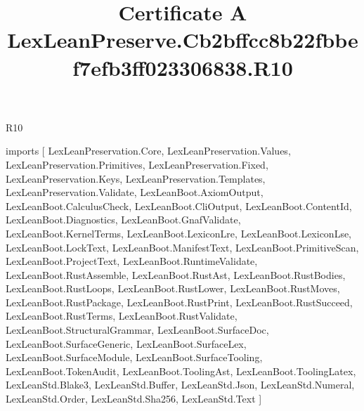 \begin{lexlean}{R10}
\title{Certificate A LexLeanPreserve.Cb2bffcc8b22fbbef7efb3ff023306838.R10}
\begin{coremodule}
imports [
  LexLeanPreservation.Core,
  LexLeanPreservation.Values,
  LexLeanPreservation.Primitives,
  LexLeanPreservation.Fixed,
  LexLeanPreservation.Keys,
  LexLeanPreservation.Templates,
  LexLeanPreservation.Validate,
  LexLeanBoot.AxiomOutput,
  LexLeanBoot.CalculusCheck,
  LexLeanBoot.CliOutput,
  LexLeanBoot.ContentId,
  LexLeanBoot.Diagnostics,
  LexLeanBoot.GnafValidate,
  LexLeanBoot.KernelTerms,
  LexLeanBoot.LexiconLre,
  LexLeanBoot.LexiconLse,
  LexLeanBoot.LockText,
  LexLeanBoot.ManifestText,
  LexLeanBoot.PrimitiveScan,
  LexLeanBoot.ProjectText,
  LexLeanBoot.RuntimeValidate,
  LexLeanBoot.RustAssemble,
  LexLeanBoot.RustAst,
  LexLeanBoot.RustBodies,
  LexLeanBoot.RustLoops,
  LexLeanBoot.RustLower,
  LexLeanBoot.RustMoves,
  LexLeanBoot.RustPackage,
  LexLeanBoot.RustPrint,
  LexLeanBoot.RustSucceed,
  LexLeanBoot.RustTerms,
  LexLeanBoot.RustValidate,
  LexLeanBoot.StructuralGrammar,
  LexLeanBoot.SurfaceDoc,
  LexLeanBoot.SurfaceGeneric,
  LexLeanBoot.SurfaceLex,
  LexLeanBoot.SurfaceModule,
  LexLeanBoot.SurfaceTooling,
  LexLeanBoot.TokenAudit,
  LexLeanBoot.ToolingAst,
  LexLeanBoot.ToolingLatex,
  LexLeanStd.Blake3,
  LexLeanStd.Buffer,
  LexLeanStd.Json,
  LexLeanStd.Numeral,
  LexLeanStd.Order,
  LexLeanStd.Sha256,
  LexLeanStd.Text
]


\end{coremodule}
\end{lexlean}
